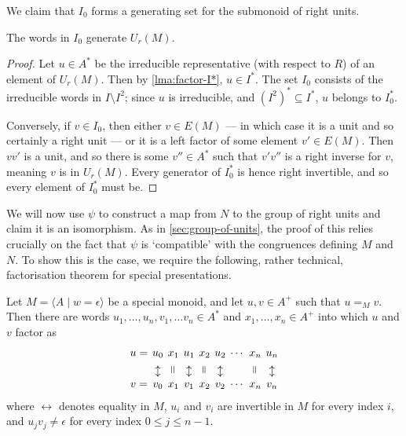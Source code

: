 \documentclass[noindex,noinsetproof,emphthm,12pt]{lmaths}
\begin{document}
We claim that $I_0$ forms a generating set for the submonoid of right units.

\begin{lemma} \label{lma:I0*-generates-Ur}
	The words in $I_0$ generate $U_r(M)$.
\end{lemma}
\begin{proof}
	Let $u \in A^*$ be the irreducible representative (with respect to $R$) of an element of $U_r(M)$. Then by \cref{lma:factor-I*}, $u \in I^*$. The set $I_0$ consists of the irreducible words in $I \setminus I^2$; since $u$ is irreducible, and $(I^2)^* \subseteq I^*$, $u$ belongs to $I_0^*$.

	Conversely, if $v \in I_0$, then either $v \in E(M)$ --- in which case it is a unit and so certainly a right unit --- or it is a left factor of some element $v' \in E(M)$. Then $vv'$ is a unit, and so there is some $v'' \in A^*$ such that $v'v''$ is a right inverse for $v$, meaning $v$ is in $U_r(M)$. Every generator of $I_0^*$ is hence right invertible, and so every element of $I_0^*$ must be.
\end{proof}

We will now use $\psi$ to construct a map from $N$ to the group of right units and claim it is an isomorphism. As in \cref{sec:group-of-units}, the proof of this relies crucially on the fact that $\psi$ is `compatible' with the congruences defining $M$ and $N$. To show this is the case, we require the following, rather technical, factorisation theorem for special presentations.

\newcommand{\verteq}{\rotatebox{90}{$=$\hspace{0.5em}}}
\newcommand{\verteqM}{\updownarrow}
\begin{lemma} \label{lma:special-factorisation}
	Let $M = \langle A \mid w = \epsilon\rangle$ be a special monoid,  and let $u, v \in A^+$ such that $u =_M v$. Then there are words $u_1, \ldots, u_n, v_1, \ldots v_n \in A^*$ and $x_1, \ldots, x_n \in A^+$ into which $u$ and $v$ factor as
		\[
		\arraycolsep=0.2em
		\begin{array}{ccccccccc}
			u =& u_0 & x_1 & u_1 & x_2 & u_2 & \cdots & x_n & u_n \\
			& \verteqM & \verteq & \verteqM & \verteq & \verteqM & & \verteq & \verteqM \\
			v =& v_0 & x_1 & v_1 & x_2 & v_2 & \cdots & x_n & v_n
		\end{array}
		\]
	where $\leftrightarrow$ denotes equality in $M$, $u_i$ and $v_i$ are invertible in $M$ for every index $i$, and $u_j v_j \ne \epsilon$ for every index $0 \le j \le n - 1$.
\end{lemma}
\end{document}
